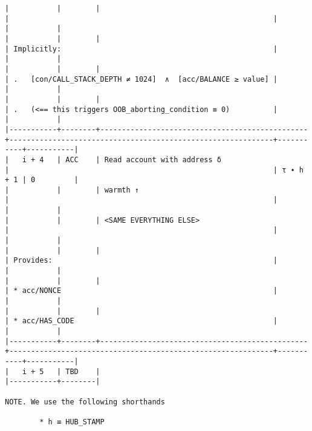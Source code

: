 \documentclass[varwidth=\maxdimen,margin=0.5cm,multi={verbatim}]{standalone}
\begin{document}
\begin{verbatim}
|           |        |                                                |                                                             |           |           |
|           |        |                                                | Implicitly:                                                 |           |           |
|           |        |                                                | .   [con/CALL_STACK_DEPTH ≠ 1024]  ∧  [acc/BALANCE ≥ value] |           |           |
|           |        |                                                | .   (<== this triggers OOB_aborting_condition ≡ 0)          |           |           |
|-----------+--------+------------------------------------------------+-------------------------------------------------------------+-----------+-----------|
|   i + 4   | ACC    | Read account with address δ                    |                                                             | τ ∙ h + 1 | 0         |
|           |        | warmth ↑                                       |                                                             |           |           |
|           |        | <SAME EVERYTHING ELSE>                         |                                                             |           |           |
|           |        |                                                | Provides:                                                   |           |           |
|           |        |                                                | * acc/NONCE                                                 |           |           |
|           |        |                                                | * acc/HAS_CODE                                              |           |           |
|-----------+--------+------------------------------------------------+-------------------------------------------------------------+-----------+-----------|
|   i + 5   | TBD    |
|-----------+--------|

NOTE. We use the following shorthands

        * h ≡ HUB_STAMP

\end{verbatim}
\end{document}
